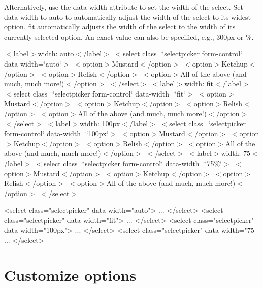 Alternatively, use the {\ttfamily data-\/width} attribute to set the width of the select. Set {\ttfamily data-\/width} to {\ttfamily \textquotesingle{}auto\textquotesingle{}} to automatically adjust the width of the select to its widest option. {\ttfamily \textquotesingle{}fit\textquotesingle{}} automatically adjusts the width of the select to the width of its currently selected option. An exact value can also be specified, e.\+g., {\ttfamily 300px} or {\%}.

    $<$label$>$width\+: \textquotesingle{}auto\textquotesingle{}$<$/label$>$ $<$select class=\char`\"{}selectpicker form-\/control\char`\"{} data-\/width=\char`\"{}auto\char`\"{}$>$ $<$option$>$Mustard$<$/option$>$ $<$option$>$Ketchup$<$/option$>$ $<$option$>$Relish$<$/option$>$ $<$option$>$All of the above (and much, much more!)$<$/option$>$ $<$/select$>$       $<$label$>$width\+: \textquotesingle{}fit\textquotesingle{}$<$/label$>$ $<$select class=\char`\"{}selectpicker form-\/control\char`\"{} data-\/width=\char`\"{}fit\char`\"{}$>$ $<$option$>$Mustard$<$/option$>$ $<$option$>$Ketchup$<$/option$>$ $<$option$>$Relish$<$/option$>$ $<$option$>$All of the above (and much, much more!)$<$/option$>$ $<$/select$>$       $<$label$>$width\+: \textquotesingle{}100px\textquotesingle{}$<$/label$>$ $<$select class=\char`\"{}selectpicker form-\/control\char`\"{} data-\/width=\char`\"{}100px\char`\"{}$>$ $<$option$>$Mustard$<$/option$>$ $<$option$>$Ketchup$<$/option$>$ $<$option$>$Relish$<$/option$>$ $<$option$>$All of the above (and much, much more!)$<$/option$>$ $<$/select$>$       $<$label$>$width\+: \textquotesingle{}75\textquotesingle{}$<$/label$>$ $<$select class=\char`\"{}selectpicker form-\/control\char`\"{} data-\/width=\char`\"{}75\%\char`\"{}$>$ $<$option$>$Mustard$<$/option$>$ $<$option$>$Ketchup$<$/option$>$ $<$option$>$Relish$<$/option$>$ $<$option$>$All of the above (and much, much more!)$<$/option$>$ $<$/select$>$    


\begin{DoxyCode}
<select class="selectpicker" data-width="auto">
  ...
</select>
<select class="selectpicker" data-width="fit">
  ...
</select>
<select class="selectpicker" data-width="100px">
  ...
</select>
<select class="selectpicker" data-width="75%
  ...
</select>
\end{DoxyCode}


\section*{Customize options}






